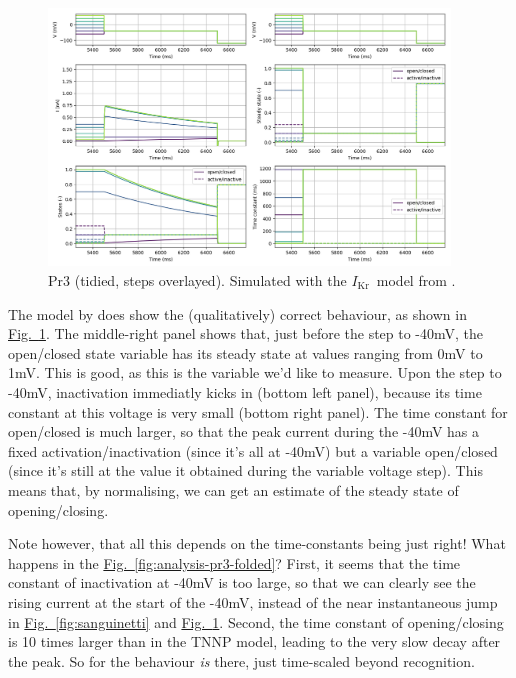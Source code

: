 \documentclass[preprint,authoryear,10pt]{elsarticle}
\newcommand\fig[2][]{\hyperref[fig:#2]{Fig.~\ref*{fig:#2}\ifstrempty{#1}{}{.#1}}}
\newcommand{\ikr}{{$I_\text{Kr}$}}
\begin{document}
\begin{figure}[H]
\centerline{
\includegraphics[width=0.95\textwidth]{fig/pr3-modified-folded-tnnp}
}
\caption{%
Pr3 (tidied, steps overlayed). Simulated with the \ikr\ model from
\citet{tenTusscher2006Model}.
}
\label{fig:analysis-pr3-tnnp}
\end{figure}

The model by \citet{tenTusscher2006Model} does show the (qualitatively) correct
behaviour, as shown in \fig{analysis-pr3-tnnp}.
The middle-right panel shows that, just before the step to -40mV, the
 open/closed state variable has its steady state at values ranging from 0mV to
 1mV.
This is good, as this is the variable we'd like to measure.
Upon the step to -40mV, inactivation immediatly kicks in (bottom left panel),
 because its time constant at this voltage is very small (bottom right panel).
The time constant for open/closed is much larger, so that the peak current
 during the -40mV has a fixed activation/inactivation (since it's all at -40mV)
 but a variable open/closed (since it's still at the value it obtained during
 the variable voltage step).
This means that, by normalising, we can get an estimate of the steady state of
 opening/closing.

Note however, that all this depends on the time-constants being just right!
What happens in the \fig{analysis-pr3-folded}?
First, it seems that the time constant of inactivation at -40mV is too large, so
that we can clearly see the rising current at the start of the -40mV, instead of
the near instantaneous jump in \fig{sanguinetti} and \fig{analysis-pr3-tnnp}.
Second, the time constant of opening/closing is 10 times larger than in the
 TNNP model, leading to the very slow decay after the peak.
So for the behaviour \emph{is} there, just time-scaled beyond recognition.
\end{document}
